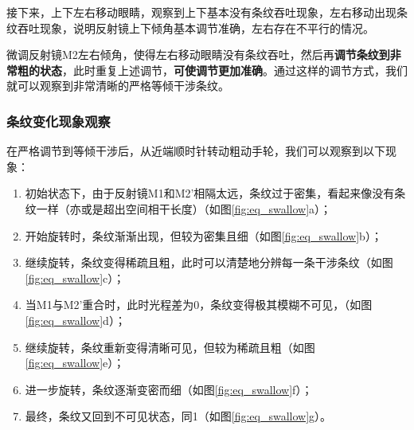 \documentclass[12pt]{article}
\begin{document}
接下来，上下左右移动眼睛，观察到上下基本没有条纹吞吐现象，左右移动出现条纹吞吐现象，说明反射镜上下倾角基本调节准确，左右存在不平行的情况。\\
\par
微调反射镜M2左右倾角，使得左右移动眼睛没有条纹吞吐，然后再\textbf{调节条纹到非常粗的状态}，此时重复上述调节，\textbf{可使调节更加准确}。通过这样的调节方式，我们就可以观察到非常清晰的严格等倾干涉条纹。
\subsubsection{条纹变化现象观察}
\quad 在严格调节到等倾干涉后，从近端顺时针转动粗动手轮，我们可以观察到以下现象：
\begin{enumerate}
    \item 初始状态下，由于反射镜M1和M2'相隔太远，条纹过于密集，看起来像没有条纹一样（亦或是超出空间相干长度）（如图\ref{fig:eq_swallow}a）；
    \item 开始旋转时，条纹渐渐出现，但较为密集且细（如图\ref{fig:eq_swallow}b）；
    \item 继续旋转，条纹变得稀疏且粗，此时可以清楚地分辨每一条干涉条纹（如图\ref{fig:eq_swallow}c）；
    \item 当M1与M2'重合时，此时光程差为0，条纹变得极其模糊不可见，（如图\ref{fig:eq_swallow}d）；
    \item 继续旋转，条纹重新变得清晰可见，但较为稀疏且粗（如图\ref{fig:eq_swallow}e）；
    \item 进一步旋转，条纹逐渐变密而细（如图\ref{fig:eq_swallow}f）；
    \item 最终，条纹又回到不可见状态，同1（如图\ref{fig:eq_swallow}g）。
\end{enumerate}
\end{document}
